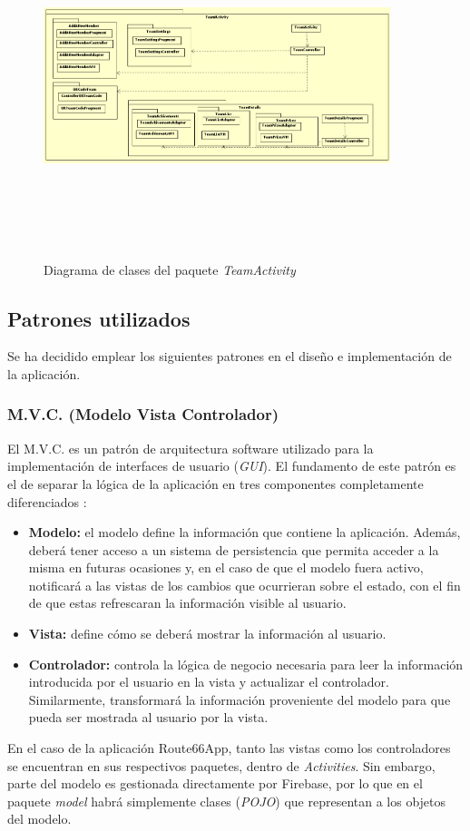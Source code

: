 \documentclass[twoside]{report}
\begin{document}
\begin{figure}[H]
\centering
\includegraphics[height=10cm,width=0.9\textwidth]{images/structureTeam.PNG}
\caption{Diagrama de clases del paquete \textit{TeamActivity}}
\end{figure}

\subsection{Patrones utilizados}
Se ha decidido emplear los siguientes patrones en el diseño e implementación de la aplicación.

\subsubsection{M.V.C. (Modelo Vista Controlador)}
El M.V.C. es un patrón de arquitectura software utilizado para la implementación de interfaces de usuario (\textit{GUI}). El fundamento de este patrón es el de separar la lógica de la aplicación en tres componentes completamente diferenciados \cite{mvcua}:
\begin{itemize}
\item \textbf{Modelo:} el modelo define la información que contiene la aplicación. Además, deberá tener acceso a un sistema de persistencia que permita acceder a la misma en futuras ocasiones y, en el caso de que el modelo fuera activo, notificará a las vistas de los cambios que ocurrieran sobre el estado, con el fin de que estas refrescaran la información visible al usuario.
\item \textbf{Vista:} define cómo se deberá mostrar la información al usuario.
\item \textbf{Controlador:} controla la lógica de negocio necesaria para leer la información introducida por el usuario en la vista y actualizar el controlador. Similarmente, transformará la información proveniente del modelo para que pueda ser mostrada al usuario por la vista.
\end{itemize}
En el caso de la aplicación Route66App, tanto las vistas como los controladores se encuentran en sus respectivos paquetes, dentro de \textit{Activities}. Sin embargo, parte del modelo es gestionada directamente por Firebase, por lo que en el paquete \textit{model} habrá simplemente clases (\textit{POJO}) que representan a los objetos del modelo.
\end{document}
